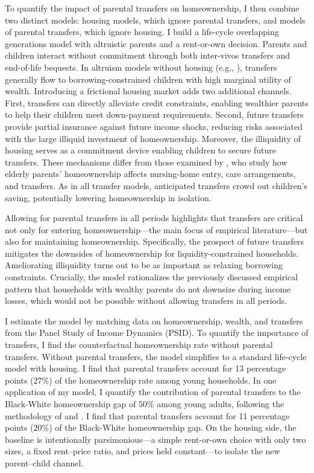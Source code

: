 \documentclass[12pt]{article}
\begin{document}
To quantify the impact of parental transfers on homeownership, I then combine two distinct models: housing models, which ignore parental transfers, and models of parental transfers, which ignore housing. I build a life-cycle overlapping generations model with altruistic parents and a rent-or-own decision. Parents and children interact without commitment through both inter-vivos transfers and end-of-life bequests.  In altruism models without housing (e.g., \citealp{Altonji1997a,Barczyk2014}), transfers generally flow to borrowing-constrained children with high marginal utility of wealth. Introducing a frictional housing market adds two additional channels. First, transfers can directly alleviate credit constraints, enabling wealthier parents to help their children meet down-payment requirements. Second, future transfers provide partial insurance against future income shocks, reducing risks associated with the large illiquid investment of homeownership. Moreover, the illiquidity of housing serves as a commitment device enabling children to secure future transfers. These mechanisms differ from those examined by \citet{Barczyk2020a}, who study how elderly parents’ homeownership affects nursing-home entry, care arrangements, and transfers.  As in all transfer models, anticipated transfers crowd out children’s saving, potentially lowering homeownership in isolation.

Allowing for parental transfers in all periods highlights that transfers are critical not only for entering homeownership---the main focus of empirical literature---but also for maintaining homeownership. Specifically, the prospect of future transfers mitigates the downsides of homeownership for liquidity-constrained households. Ameliorating illiquidity turns out to be as important as relaxing borrowing constraints. Crucially, the model rationalizes the previously discussed empirical pattern that households with wealthy parents do not downsize during income losses, which would not be possible without allowing transfers in all periods. 

I estimate the model by matching data on homeownership, wealth, and transfers from the Panel Study of Income Dynamics (PSID). To quantify the importance of transfers, I find the counterfactual homeownership rate without parental transfers. Without parental transfers, the model simplifies to a standard life-cycle model with housing. I find that parental transfers account for 13 percentage points (27\%) of the homeownership rate among young households. In one application of my model, I quantify the contribution of parental transfers to the Black-White homeownership gap of 50\% among young adults, following the  methodology of \cite{Ashman2020} and \cite{aliprantis2022dynamics}. I find that parental transfers account for 11 percentage points (20\%) of the Black-White homeownership gap. On the housing side, the baseline is intentionally parsimonious---a simple rent-or-own choice with only two sizes, a fixed rent–price ratio, and prices held constant---to isolate the new parent–child channel.
\end{document}
